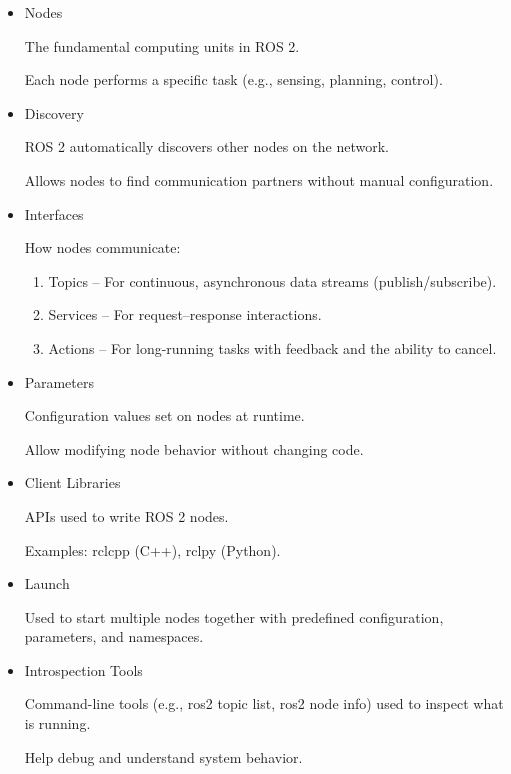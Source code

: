 {
	\begin{itemize}
	\item Nodes
	
	The fundamental computing units in ROS 2.
	
	Each node performs a specific task (e.g., sensing, planning, control).
	
	\item Discovery
	
	ROS 2 automatically discovers other nodes on the network.
	
	Allows nodes to find communication partners without manual configuration.
	
	\item Interfaces
	
	How nodes communicate:
	\begin{enumerate}
		\item Topics – For continuous, asynchronous data streams (publish/subscribe).
		
		\item Services – For request–response interactions.
		
		\item Actions – For long-running tasks with feedback and the ability to cancel.
	\end{enumerate}
	
	\item Parameters
	
	Configuration values set on nodes at runtime.
	
	Allow modifying node behavior without changing code.
	
	\item Client Libraries
	
	APIs used to write ROS 2 nodes.
	
	Examples: rclcpp (C++), rclpy (Python).
	
	\item Launch
	
	Used to start multiple nodes together with predefined configuration, parameters, and namespaces.
	
	\item Introspection Tools
	
	Command-line tools (e.g., ros2 topic list, ros2 node info) used to inspect what is running.
	
	Help debug and understand system behavior.
\end{itemize}
}
